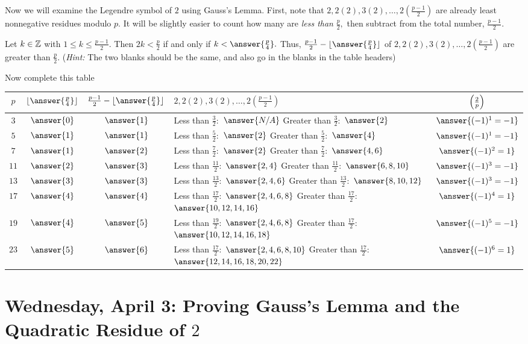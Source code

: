 \documentclass[letterpaper, 11 pt]{ximera}
\begin{document}
\begin{br}
	Now we will examine the Legendre symbol of $2$ using Gauss's Lemma. First, note that $2,2(2),3(2),\dots,2(\frac{p-1}{2})$ are already least nonnegative residues modulo $p.$ It will be slightly easier to count how many are \emph{less than} $\frac{p}{2},$ then subtract from the total number, $\frac{p-1}{2}.$

	Let $k\in\mathbb Z$ with $1\leq k\leq \frac{p-1}{2}.$ Then $2k< \frac{p}{2}$ if and only if $k <\answer{\frac{p}{4}}.$ Thus, $\frac{p-1}{2}-\lfloor\answer{\frac{p}{4}}\rfloor$ of $2,2(2),3(2),\dots,2(\frac{p-1}{2})$ are greater than $\frac{p}{2}.$ (\emph{Hint:} The two blanks should be the same, and also go in the blanks in the table headers)

	Now complete this table

	\begin{tabular}{c|cclc}
		$p$ & $\lfloor\answer{\frac{p}{4}}\rfloor$ & $\frac{p-1}{2}-\lfloor\answer{\frac{p}{4}}\rfloor$ & $2,2(2),3(2),\dots,2(\frac{p-1}{2})$ & $\left(\frac{2}{p}\right)$\\\hline
		$3$ & $\answer{0}$	& $\answer{1}$
			& \makecell{Less than $\tfrac{3}{2}:$ $\answer{N/A}$
			\\Greater than $\tfrac{3}{2}:$ $\answer{2}$}
			& $\answer{(-1)^1=-1}$\\\hline
		$5$ & $\answer{1}$	& $\answer{1}$
			& \makecell{Less than $\tfrac{5}{2}:$ $\answer{2}$
			\\Greater than $\tfrac{5}{2}:$ $\answer{4}$}
			& $\answer{(-1)^1=-1}$\\\hline
		$7$ & $\answer{1}$	& $\answer{2}$ 
			& \makecell{Less than $\tfrac{7}{2}:$ $\answer{2}$
			\\Greater than $\tfrac{7}{2}:$ $\answer{4,6}$}
			& $\answer{(-1)^2=1}$\\\hline
		$11$ & $\answer{2}$	& $\answer{3}$
			& \makecell{Less than $\tfrac{11}{2}:$ $\answer{2,4}$
			\\Greater than $\tfrac{11}{2}:$ $\answer{6,8,10}$}
			& $\answer{(-1)^3=-1}$\\\hline
		$13$ & $\answer{3}$	& $\answer{3}$
			& \makecell{Less than $\tfrac{13}{2}:$ $\answer{2,4,6}$
			\\Greater than $\tfrac{13}{2}:$ $\answer{8,10,12}$}
			& $\answer{(-1)^3=-1}$\\\hline
		$17$ & $\answer{4}$	& $\answer{4}$
			& \makecell{Less than $\tfrac{17}{2}:$ $\answer{2,4,6,8}$
			\\Greater than $\tfrac{17}{2}:$ $\answer{10,12,14,16}$}
			& $\answer{(-1)^4=1}$\\\hline
		$19$ & $\answer{4}$	& $\answer{5}$
			& \makecell{Less than $\tfrac{19}{2}:$ $\answer{2,4,6,8}$
		\\Greater than $\tfrac{17}{2}:$ $\answer{10,12,14,16,18}$}
		& $\answer{(-1)^5=-1}$\\\hline
		$23$ & $\answer{5}$	& $\answer{6}$
			& \makecell{Less than $\tfrac{17}{2}:$ $\answer{2,4,6,8,10}$
			\\Greater than $\tfrac{17}{2}:$ $\answer{12,14,16,18,20,22}$}
			& $\answer{(-1)^6=1}$\\\hline
	\end{tabular}
\end{br}

\section{Wednesday, April 3: Proving Gauss's Lemma and the Quadratic Residue of $2$}
\end{document}
